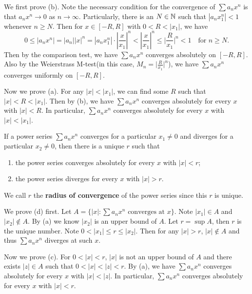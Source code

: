     \begin{proofenv}
        We first prove (b). Note the necessary condition for the convergence of $\sum a_n x^n$ is that $a_n x^n \to 0$ as $n\to \infty$. Particularly, there is an $N\in \mathbb{N}$ such that $|a_n x_1^n| < 1$ whenever $n\ge N$. Then for $x\in [-R,R]$ with $0<R<|x_1|$, we have
        $$ 0\le |a_n x^n| = |a_n||x|^n = |a_n x_1^n| \cdot \left|\frac{x}{x_1}\right|^n < \left|\frac{x}{x_1}\right|^n\le \Big| \frac{R}{x_1}\Big|^n < 1 \quad \text{for } n\ge N. $$
        Then by the comparison test, we have $\sum a_n x^n$ converges absolutely on $[-R,R]$. Also by the Weierstrass M-test(in this case, $M_n = \displaystyle\Big| \frac{R}{x_1}\Big|^n$), we have $\sum a_n x^n$ converges uniformly on $[-R,R]$.

        Now we prove (a). For any $|x|<|x_1|$, we can find some $R$ such that $|x| < R < |x_1|$. Then by (b), we have $\sum a_n x^n$ converges absolutely for every $x$ with $|x| < R$. In particular, $\sum a_n x^n$ converges absolutely for every $x$ with $|x| < |x_1|$.
    \end{proofenv}
    \begin{theoremenv}\label{radius_of_convergence}
        If a power series $\sum a_n x^n$ converges for a particular $x_1 \neq 0$ and diverges for a particular $x_2 \neq 0$, then there is a unique $r$ such that
        \begin{enumerate}[label=(\alph*),start=3]
            \item the power series converges absolutely for every $x$ with $|x| < r$;
            \item the power series diverges for every $x$ with $|x| > r$.
        \end{enumerate}
        We call $r$ the \textbf{radius of convergence} of the power series since this $r$ is unique.
    \end{theoremenv}
    \begin{proofenv}
        We prove (d) first. Let $A=\{ |x| : \displaystyle \sum a_n x^n \text{ converges at } x\}$. Note $|x_1|\in A$ and $|x_2|\notin A$. By (a) we know $|x_2|$ is an upper bound of $A$. Let $r = \sup A$, then $r$ is the unique number. Note $0<|x_1| \le r \le |x_2|$. Then for any $|x|>r$, $|x|\notin A$ and thus $\sum a_n x^n$ diverges at such $x$.

        Now we prove (c). For $0<|x|<r$, $|x|$ is not an upper bound of $A$ and there exists $|z| \in A$ such that $0<|x| < |z| < r$. By (a), we have $\sum a_n x^n$ converges absolutely for every $x$ with $|x| < |z|$. In particular, $\sum a_n x^n$ converges absolutely for every $x$ with $|x| < r$.
    \end{proofenv}
